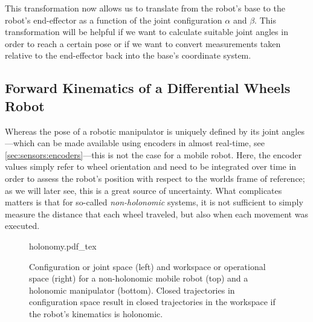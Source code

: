 This transformation now allows us to translate from the robot's base to the robot's end-effector as a function of the joint configuration $\alpha$ and $\beta$.
This transformation will be helpful if we want to calculate suitable joint angles in order to reach a certain pose or if we want to convert measurements taken relative to the end-effector back into the base's coordinate system.

\subsection{Forward Kinematics of a Differential Wheels Robot}\label{sec:kinematics:fwkmobile}

Whereas the pose of a robotic manipulator is uniquely defined by its joint angles---which can be made available using encoders in almost real-time, see \cref{sec:sensors:encoders}---this is not the case for a mobile robot.
Here, the encoder values simply refer to wheel orientation and need to be integrated over time in order to assess the robot's position with respect to the worlds frame of reference; as we will later see, this is a great source of uncertainty.
What complicates matters is that for so-called \emph{non-holonomic} systems, it is not sufficient to simply measure the distance that each wheel traveled, but also when each movement was executed.

\begin{figure}
    \small
    \centering
    \def\svgwidth{\textwidth}
    {holonomy.pdf_tex}
    \caption{Configuration or joint space (left) and workspace or operational space (right) for a non-holonomic mobile robot (top) and a holonomic manipulator (bottom). Closed trajectories in configuration space result in closed trajectories in the workspace if the robot's kinematics is holonomic.}
    \label{fig:holonomy}
\end{figure}

